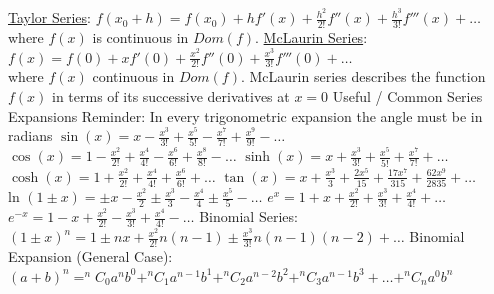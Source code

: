 \documentclass[12pt]{article}
\def\ln{\text{ln\ }} %
\begin{document}
\begin{flushleft}
	\textbullet \quad \uline{Taylor Series}: $\displaystyle f(x_0 + h) = f(x_0) + hf'(x) + \frac{h^2}{2!}f''(x) + \frac{h^3}{3!}f'''(x) + \ldots $ \\ 
		where $f(x)$ is continuous in $Dom(f)$. \linebreak 
	\textbullet \quad \uline{McLaurin Series}: $\displaystyle f(x) = f(0) + xf'(0) + \frac{x^2}{2!} f''(0) + \frac{x^3}{3!} f'''(0) + \ldots $ \\ 
		where $f(x)$ continuous in $Dom(f)$. McLaurin series describes the function $f(x)$ in terms of its successive derivatives at $x=0$ \linebreak 
	Useful / Common Series Expansions \linebreak 
	Reminder: In every trigonometric expansion the angle must be in radians \linebreak 
	\textbullet \quad $\displaystyle \sin (x) = x - \frac{x^3}{3!} + \frac{x^5}{5!} - \frac{x^7}{7!} + \frac{x^9}{9!} - \ldots $ \linebreak 
	\textbullet \quad $\displaystyle \cos (x) = 1 - \frac{x^2}{2!} + \frac{x^4}{4!} - \frac{x^6}{6!} + \frac{x^8}{8!} - \ldots $ \linebreak 
	\textbullet \quad $\displaystyle \sinh (x) = x + \frac{x^3}{3!} + \frac{x^5}{5!} + \frac{x^7}{7!} + \ldots $ \linebreak 
	\textbullet \quad $\displaystyle \cosh (x) = 1 + \frac{x^2}{2!} + \frac{x^4}{4!} + \frac{x^6}{6!} + \ldots $ \linebreak 
	\textbullet \quad $\displaystyle \tan (x) = x + \frac{x^3}{3} + \frac{2x^5}{15} + \frac{17x^7}{315} + \frac{62x^9}{2 835} + \ldots $ \linebreak 
	\textbullet \quad $\displaystyle \ln (1 \pm x) = \pm x -\frac{x^2}{2} \pm \frac{x^3}{3} -\frac{x^4}{4} \pm \frac{x^5}{5} - \ldots $ \linebreak 
	\textbullet \quad $\displaystyle e^x = 1 + x + \frac{x^2}{2!} + \frac{x^3}{3!} + \frac{x^4}{4!} + \ldots $ \linebreak 
	\textbullet \quad $\displaystyle e^{-x} = 1 - x + \frac{x^2}{2!} - \frac{x^3}{3!} + \frac{x^4}{4!} - \ldots $ \linebreak 
	\textbullet \quad Binomial Series: $\displaystyle  (1 \pm x)^n = 1 \pm nx + \frac{x^2}{2!}n(n-1) \pm \frac{x^3}{3!} n(n-1)(n-2) + \ldots $ \linebreak 
	\textbullet \quad  Binomial Expansion (General Case): $\displaystyle  (a+b)^n = ^{n}C_0 a^n b^0 + ^{n}C_1 a^{n-1} b^1 + ^{n}C_2 a^{n-2}b^2 + ^{n}C_3 a^{n-1}b^3 + \ldots + ^{n}C_n a^0 b^n $ \linebreak 

\end{flushleft}
\end{document}
